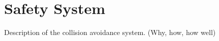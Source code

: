 \section{Safety System \label{sec:mr_safety_sec}}

Description of the collision avoidance system. (Why, how, how well)
